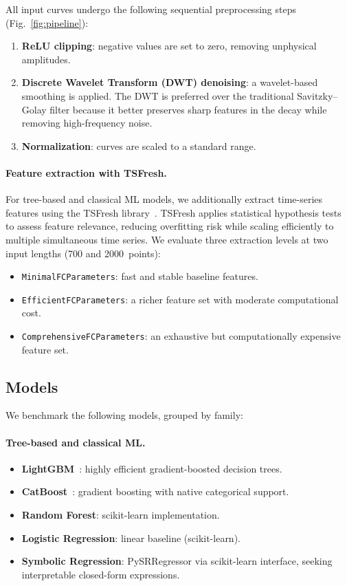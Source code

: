 \documentclass[runningheads]{llncs}
\begin{document}
All input curves undergo the following sequential preprocessing steps (Fig.~\ref{fig:pipeline}):
\begin{enumerate}
  \item \textbf{ReLU clipping}: negative values are set to zero, removing unphysical amplitudes.
  \item \textbf{Discrete Wavelet Transform (DWT) denoising}: a wavelet-based smoothing is applied.
        The DWT is preferred over the traditional Savitzky--Golay filter because it better preserves
        sharp features in the decay while removing high-frequency noise.
  \item \textbf{Normalization}: curves are scaled to a standard range.
\end{enumerate}

\paragraph{Feature extraction with TSFresh.}
For tree-based and classical ML models, we additionally extract time-series features using the
TSFresh library~\cite{ref_tsfresh}. TSFresh applies statistical hypothesis tests to assess
feature relevance, reducing overfitting risk while scaling efficiently to multiple simultaneous
time series. We evaluate three extraction levels at two input lengths (700 and 2000~points):
\begin{itemize}
  \item \texttt{MinimalFCParameters}: fast and stable baseline features.
  \item \texttt{EfficientFCParameters}: a richer feature set with moderate computational cost.
  \item \texttt{ComprehensiveFCParameters}: an exhaustive but computationally expensive feature set.
\end{itemize}

\subsection{Models}
\label{sec:models}

We benchmark the following models, grouped by family:

\paragraph{Tree-based and classical ML.}
\begin{itemize}
  \item \textbf{LightGBM}~\cite{ref_lightgbm}: highly efficient gradient-boosted decision trees.
  \item \textbf{CatBoost}~\cite{ref_catboost}: gradient boosting with native categorical support.
  \item \textbf{Random Forest}: scikit-learn implementation.
  \item \textbf{Logistic Regression}: linear baseline (scikit-learn).
  \item \textbf{Symbolic Regression}: PySRRegressor via scikit-learn interface, seeking interpretable
        closed-form expressions.
\end{itemize}
\end{document}
